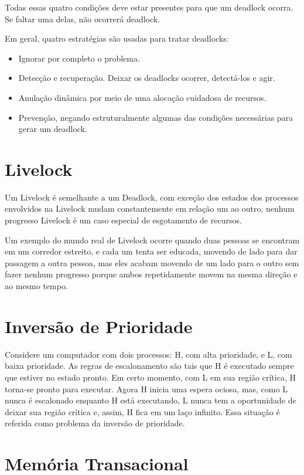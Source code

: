 Todas essas quatro condições deve estar presentes para que um deadlock ocorra. Se faltar
uma delas, não ocorrerá deadlock.

Em geral, quatro estratégias são usadas para tratar deadlocks:

\begin{itemize}
\item Ignorar por completo o problema.
\item Detecção e recuperação. Deixar os deadlocks ocorrer, detectá-los e agir.
\item Anulação dinâmica por meio de uma alocação cuidadosa de recursos.
\item Prevenção, negando estruturalmente algumas das condições necessárias para gerar um deadlock.
\end{itemize}

\section{Livelock}

Um Livelock é semelhante a um Deadlock, com exceção dos estados dos processos envolvidos na 
Livelock mudam constantemente em relação um ao outro, nenhum progresso Livelock é um caso 
especial de esgotamento de recursos.

Um exemplo do mundo real de Livelock ocorre quando duas pessoas se encontram em um corredor 
estreito, e cada um tenta ser educada, movendo de lado para  dar passagem a outra pessoa, 
mas eles acabam movendo de um lado para o outro sem fazer nenhum progresso porque ambos 
repetidamente movem na mesma direção e ao mesmo tempo.

\section{Inversão de Prioridade}

Considere um computador com dois processos: H, com alta prioridade, e L, com baixa prioridade. 
As regras de escalonamento são tais que H é executado sempre que estiver no estado pronto. 
Em certo momento, com L em sua região crítica, H torna-se pronto para executar. Agora H inicia 
uma espera ociosa, mas, como L nunca é escalonado enquanto H está executando, L nunca tem a 
oportunidade de deixar sua região crítica e, assim, H fica em um laço infinito. Essa situação 
é referida como problema da inversão de prioridade.

\section{Memória Transacional}

